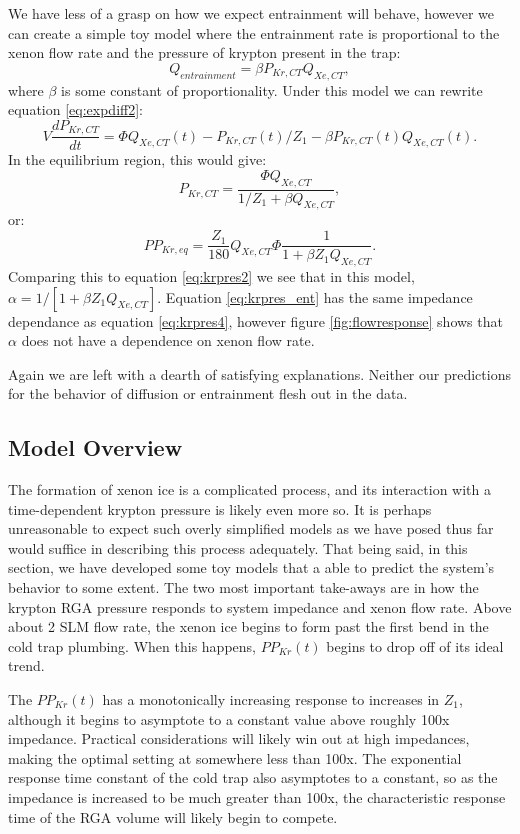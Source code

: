 We have less of a grasp on how we expect entrainment will behave, however we can create a simple toy model where the entrainment rate is proportional to the xenon flow rate and the pressure of krypton present in the trap:
\begin{equation}
Q_{entrainment}=\beta P_{Kr,CT}Q_{Xe,CT},
\end{equation}
where $\beta$ is some constant of proportionality. Under this model we can rewrite equation \ref{eq:expdiff2}:
\begin{equation}
V\frac{dP_{Kr,CT}}{dt}=\Phi Q_{Xe,CT}(t)-P_{Kr,CT}(t)/Z_1-\beta P_{Kr,CT}(t)Q_{Xe,CT}(t).
\end{equation}
In the equilibrium region, this would give:
\begin{equation}
P_{Kr,CT}=\frac{\Phi Q_{Xe,CT}}{1/Z_1+\beta Q_{Xe,CT}},
\end{equation}
or:
\begin{equation}
\label{eq:krpres_ent}
PP_{Kr,eq}=\frac{Z_1}{180}Q_{Xe,CT}\Phi \frac{1}{1+\beta Z_1 Q_{Xe,CT}}.
\end{equation}
Comparing this to equation \ref{eq:krpres2} we see that in this model, $\alpha=1/[1+\beta Z_1 Q_{Xe,CT}]$. Equation \ref{eq:krpres_ent} has the same impedance dependance as equation \ref{eq:krpres4}, however figure \ref{fig:flowresponse} shows that $\alpha$ does not have a dependence on xenon flow rate.

Again we are left with a dearth of satisfying explanations. Neither our predictions for the behavior of diffusion or entrainment flesh out in the data. 


\subsection{Model Overview}
The formation of xenon ice is a complicated process, and its interaction with a time-dependent krypton pressure is likely even more so. It is perhaps unreasonable to expect such overly simplified models as we have posed thus far would suffice in describing this process adequately. That being said, in this section, we have developed some toy models that a able to predict the system's behavior to some extent. The two most important take-aways are in how the krypton RGA pressure responds to system impedance and xenon flow rate. Above about 2 SLM flow rate, the xenon ice begins to form past the first bend in the cold trap plumbing. When this happens, $PP_{Kr}(t)$ begins to drop off of its ideal trend. 

The $PP_{Kr}(t)$ has a monotonically increasing response to increases in $Z_1$, although it begins to asymptote to a constant value above roughly 100x impedance. Practical considerations will likely win out at high impedances, making the optimal setting at somewhere less than 100x. The exponential response time constant of the cold trap also asymptotes to a constant, so as the impedance is increased to be much greater than 100x, the characteristic response time of the RGA volume will likely begin to compete. 

